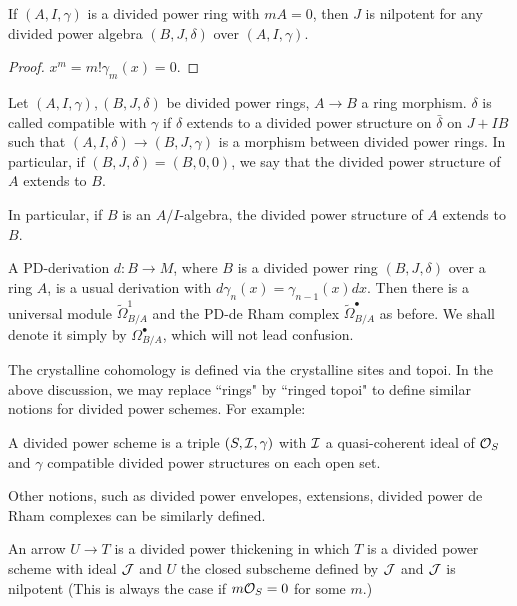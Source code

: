 \begin{proposition}
    If $(A, I, \gamma)$ is a divided power ring with $m A = 0$, 
    then $J$ is nilpotent for any divided power algebra 
    $(B, J, \delta)$ over $(A, I, \gamma)$.
\end{proposition}

\begin{proof}
    $x^m = m! \gamma_m(x) = 0$.
\end{proof}

\begin{definition}
    Let $(A, I, \gamma),(B, J, \delta)$ be divided power rings, 
    $A \to B$ a ring morphism. 
    $\delta$ is called compatible with $\gamma$ 
    if $\delta$ extends to a divided power structure on $\bar{\delta}$ on $J + IB$ 
    such that $(A, I, \delta)\to (B, J, \gamma)$ 
    is a morphism between divided power rings. 
    In particular, if $(B, J, \delta)=(B, 0, 0)$, 
    we say that the divided power structure of $A$ extends to $B$.
\end{definition}
In particular, if $B$ is an $A / I$-algebra, 
the divided power structure of $A$ extends to $B$.
\begin{definition}
    A PD-derivation $d \colon B \to M$, 
    where $B$ is a divided power ring $(B, J, \delta)$ over a ring $A$, 
    is a usual derivation with $d \gamma_n(x) = \gamma_{n-1}(x) dx$. 
    Then there is a universal module $\tilde{\Omega}_{B/A}^1$ 
    and the PD-de Rham complex $\tilde{\Omega}_{B/A}^\bullet$ as before. 
    We shall denote it simply by $\Omega_{B/A}^\bullet$, 
    which will not lead confusion.
\end{definition}
The crystalline cohomology is defined via the crystalline sites and topoi. 
In the above discussion, 
we may replace ``rings" by ``ringed topoi" 
to define similar notions for divided power schemes. 
For example:
\begin{definition}
    A divided power scheme is a triple $(S, {\mathcal {I}}, \gamma)$ 
    with ${\mathcal {I}}$ a quasi-coherent ideal of ${\mathcal {O}}_S$ 
    and $\gamma$ compatible divided power structures on each open set.
\end{definition}

Other notions, such as divided power envelopes, extensions, 
divided power de Rham complexes can be similarly defined.
\begin{definition}
    An arrow $U \to T$ is a divided power thickening in which 
    $T$ is a divided power scheme with ideal ${\mathcal {J}}$ and 
    $U$ the closed subscheme defined by ${\mathcal {J}}$ and 
    ${\mathcal {J}}$ is nilpotent (This is always the case if $m {\mathcal {O}}_S=0$ for some $m$.)
\end{definition}

